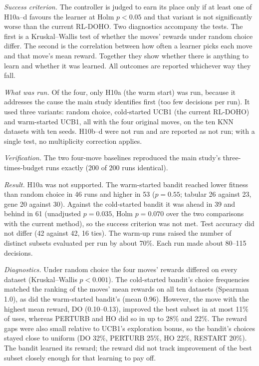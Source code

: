 \documentclass[journal]{IEEEtran}
\begin{document}
\emph{Success criterion.} The controller is judged to earn its place only if at least one of H10a--d favours the learner at Holm $p<0.05$ and that variant is not significantly worse than the current RL-DOHO. Two diagnostics accompany the tests. The first is a Kruskal--Wallis test of whether the moves' rewards under random choice differ. The second is the correlation between how often a learner picks each move and that move's mean reward. Together they show whether there is anything to learn and whether it was learned. All outcomes are reported whichever way they fall.

\emph{What was run.} Of the four, only H10a (the warm start) was run, because it addresses the cause the main study identifies first (too few decisions per run). It used three variants: random choice, cold-started UCB1 (the current RL-DOHO) and warm-started UCB1, all with the four original moves, on the ten KNN datasets with ten seeds. H10b--d were not run and are reported as not run; with a single test, no multiplicity correction applies.

\emph{Verification.} The two four-move baselines reproduced the main study's three-times-budget runs exactly (200 of 200 runs identical).

\emph{Result.} H10a was not supported. The warm-started bandit reached lower fitness than random choice in 46 runs and higher in 53 ($p=0.55$; tabular 26 against 23, gene 20 against 30). Against the cold-started bandit it was ahead in 39 and behind in 61 (unadjusted $p=0.035$, Holm $p=0.070$ over the two comparisons with the current method), so the success criterion was not met. Test accuracy did not differ (42 against 42, 16 ties). The warm-up runs raised the number of distinct subsets evaluated per run by about 70\%. Each run made about 80--115 decisions.

\emph{Diagnostics.} Under random choice the four moves' rewards differed on every dataset (Kruskal--Wallis $p<0.001$). The cold-started bandit's choice frequencies matched the ranking of the moves' mean rewards on all ten datasets (Spearman 1.0), as did the warm-started bandit's (mean 0.96). However, the move with the highest mean reward, DO (0.10--0.13), improved the best subset in at most 11\% of uses, whereas PERTURB and HO did so in up to 28\% and 22\%. The reward gaps were also small relative to UCB1's exploration bonus, so the bandit's choices stayed close to uniform (DO 32\%, PERTURB 25\%, HO 22\%, RESTART 20\%). The bandit learned its reward; the reward did not track improvement of the best subset closely enough for that learning to pay off.
\end{document}
